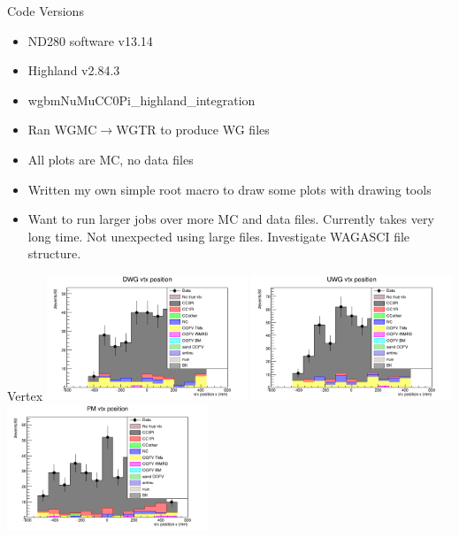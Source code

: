 \documentclass{beamer}
\begin{document}
\begin{frame}{Code Versions}
\begin{itemize}
    \item ND280 software v13.14
    \item Highland v2.84.3
    \item wgbmNuMuCC0Pi\_highland\_integration
    \item Ran WGMC$\rightarrow$WGTR to produce WG files 
    \item All plots are MC, no data files
    \item Written my own simple root macro to draw some plots with drawing tools 
\end{itemize}
 \begin{itemize}
       \item \color{red} Want to run larger jobs over more MC and data files. Currently takes very long time. Not unexpected using large files. Investigate WAGASCI file structure.
   \end{itemize}
\end{frame}

\begin{frame}{Vertex}
    \includegraphics[width=0.45\textwidth]{images/vtx_reco_pos[0]_wgbm_topo_DWG_accum_level[][26]_data_mc.png}
    \includegraphics[width=0.45\textwidth]{images/vtx_reco_pos[0]_wgbm_topo_UWG_accum_level[][16]_data_mc.png}
    \includegraphics[width=0.45\textwidth]{images/vtx_reco_pos[0]_wgbm_topo_PM_accum_level[][06]_data_mc.png}
\end{frame}
\end{document}
